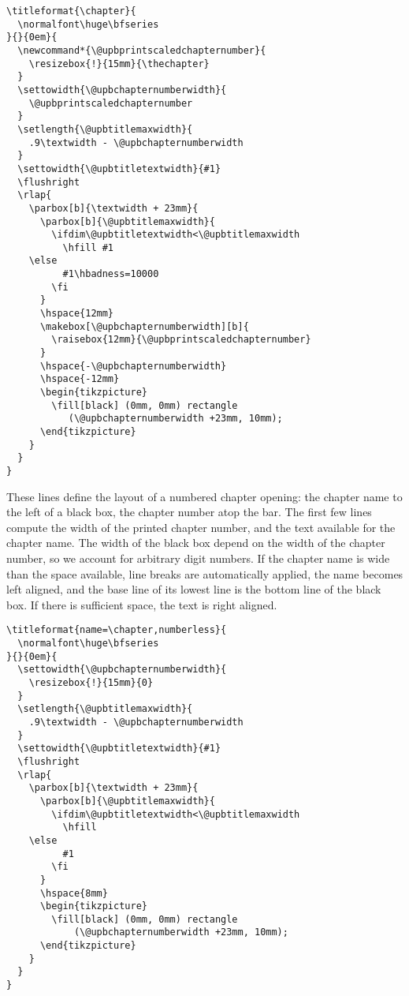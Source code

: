 \begin{verbatim}
\titleformat{\chapter}{
  \normalfont\huge\bfseries
}{}{0em}{
  \newcommand*{\@upbprintscaledchapternumber}{
    \resizebox{!}{15mm}{\thechapter}
  }   
  \settowidth{\@upbchapternumberwidth}{
    \@upbprintscaledchapternumber
  }   
  \setlength{\@upbtitlemaxwidth}{
    .9\textwidth - \@upbchapternumberwidth 
  }   
  \settowidth{\@upbtitletextwidth}{#1}
  \flushright
  \rlap{
    \parbox[b]{\textwidth + 23mm}{
      \parbox[b]{\@upbtitlemaxwidth}{
        \ifdim\@upbtitletextwidth<\@upbtitlemaxwidth
          \hfill #1
	\else
          #1\hbadness=10000
        \fi 
      }   
      \hspace{12mm}
      \makebox[\@upbchapternumberwidth][b]{
        \raisebox{12mm}{\@upbprintscaledchapternumber}
      }   
      \hspace{-\@upbchapternumberwidth}
      \hspace{-12mm}
      \begin{tikzpicture}
        \fill[black] (0mm, 0mm) rectangle
           (\@upbchapternumberwidth +23mm, 10mm);
      \end{tikzpicture}
    }   
  }   
}
\end{verbatim}

\vspace*{-6pt} \noindent
These lines define the layout of a numbered chapter opening:
the chapter name to the left of a black box, the chapter number atop the bar.
The first few lines compute the width of the printed chapter number, and the
text available for the chapter name.
The width of the black box depend on the width of the chapter number, so we
account for arbitrary digit numbers.
If the chapter name is wide than the space available, line breaks are
automatically applied, the name becomes left aligned, and the base line of its
lowest line is the bottom line of the black box.
If there is sufficient space, the text is right aligned.



\begin{verbatim}
\titleformat{name=\chapter,numberless}{
  \normalfont\huge\bfseries
}{}{0em}{
  \settowidth{\@upbchapternumberwidth}{
    \resizebox{!}{15mm}{0}
  }   
  \setlength{\@upbtitlemaxwidth}{
    .9\textwidth - \@upbchapternumberwidth 
  }   
  \settowidth{\@upbtitletextwidth}{#1}
  \flushright
  \rlap{
    \parbox[b]{\textwidth + 23mm}{
      \parbox[b]{\@upbtitlemaxwidth}{
        \ifdim\@upbtitletextwidth<\@upbtitlemaxwidth
          \hfill
	\else
          #1  
        \fi 
      }   
      \hspace{8mm}
      \begin{tikzpicture}
        \fill[black] (0mm, 0mm) rectangle
            (\@upbchapternumberwidth +23mm, 10mm);
      \end{tikzpicture}
    }
  }
}
\end{verbatim}

